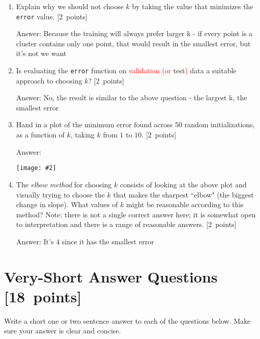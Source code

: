 \documentclass{article}
\newcommand{\blu}[1]{{\textcolor{blu}{#1}}}
\newcommand{\gre}[1]{\textcolor{gre}{#1}}
\newcommand{\red}[1]{\textcolor{red}{#1}}
\newcommand\ans[1]{\par\gre{Answer: #1}}
\newenvironment{answer}{\par\begingroup\color{gre}Answer: }{\endgroup}
\let\ask\blu
\let\update\red
\newcommand\pts[1]{\textcolor{pointscolour}{[#1~points]}}
\newcommand{\centerfig}[2]{\begin{center}\texttt{[image: \#2]}\end{center}}
\begin{document}
    \begin{enumerate}
        \item \ask{Explain why we should not choose $k$ by taking the value that minimizes the \texttt{error} value.} \pts{2}
        \ans{Because the training will always prefer larger k - if every point is a cluster contains only one point, that would result in the smallest error, but it's not we want}
        \item \ask{Is evaluating the \texttt{error} function on \update{validation (or} test\update{)} data a suitable approach to choosing $k$?} \pts{2}
        \ans{No, the result is similar to the above question - the largest k, the smallest error}
        \item \ask{Hand in a plot of the minimum error found across 50 random initializations, as a function of $k$, taking $k$ from $1$ to $10$.} \pts{2}
        \begin{answer}
            \centerfig{.7}{figs/k-means-best-k.png}
        \end{answer}
        \item The \emph{elbow method} for choosing $k$ consists of looking at the above plot and visually trying to choose the $k$ that makes the sharpest ``elbow" (the biggest change in slope). \ask{What values of $k$ might be reasonable according to this method?} Note: there is not a single correct answer here; it is somewhat open to interpretation and there is a range of reasonable answers. \pts{2}
        \ans{It's 4 since it has the smallest error}
    \end{enumerate}

    \clearpage
    \section{Very-Short Answer Questions \pts{18}}

    \ask{Write a short one or two sentence answer to each of the questions below}. Make sure your answer is clear and concise.
\end{document}
